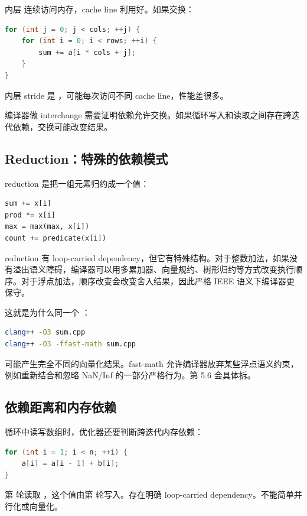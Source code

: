 内层  连续访问内存，cache line 利用好。如果交换：

\begin{lstlisting}[language=C++]
for (int j = 0; j < cols; ++j) {
    for (int i = 0; i < rows; ++i) {
        sum += a[i * cols + j];
    }
}
\end{lstlisting}

内层 stride 是 ，可能每次访问不同 cache line，性能差很多。

编译器做 interchange 需要证明依赖允许交换。如果循环写入和读取之间存在跨迭代依赖，交换可能改变结果。

\subsection{Reduction：特殊的依赖模式}

reduction 是把一组元素归约成一个值：

\begin{lstlisting}
sum += x[i]
prod *= x[i]
max = max(max, x[i])
count += predicate(x[i])
\end{lstlisting}

reduction 有 loop-carried dependency，但它有特殊结构。对于整数加法，如果没有溢出语义障碍，编译器可以用多累加器、向量规约、树形归约等方式改变执行顺序。对于浮点加法，顺序改变会改变舍入结果，因此严格 IEEE 语义下编译器更保守。

这就是为什么同一个 ：

\begin{lstlisting}[language=bash]
clang++ -O3 sum.cpp
clang++ -O3 -ffast-math sum.cpp
\end{lstlisting}

可能产生完全不同的向量化结果。fast-math 允许编译器放弃某些浮点语义约束，例如重新结合和忽略 NaN/Inf 的一部分严格行为。第 5.6 会具体拆。

\subsection{依赖距离和内存依赖}

循环中读写数组时，优化器还要判断跨迭代内存依赖：

\begin{lstlisting}[language=C++]
for (int i = 1; i < n; ++i) {
    a[i] = a[i - 1] + b[i];
}
\end{lstlisting}

第  轮读取 ，这个值由第  轮写入。存在明确 loop-carried dependency。不能简单并行化或向量化。

